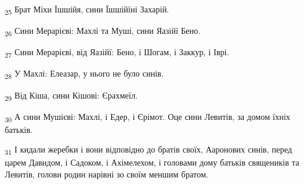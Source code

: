 \begin{tcolorbox}
\textsubscript{25} Брат Міхи Їшшійя, сини Їшшійїні Захарій.
\end{tcolorbox}
\begin{tcolorbox}
\textsubscript{26} Сини Мерарієві: Махлі та Муші, сини Яазійї Бено.
\end{tcolorbox}
\begin{tcolorbox}
\textsubscript{27} Сини Мерарієві, від Яазійї: Бено, і Шогам, і Заккур, і Іврі.
\end{tcolorbox}
\begin{tcolorbox}
\textsubscript{28} У Махлі: Елеазар, у нього не було синів.
\end{tcolorbox}
\begin{tcolorbox}
\textsubscript{29} Від Кіша, сини Кішові: Єрахмеїл.
\end{tcolorbox}
\begin{tcolorbox}
\textsubscript{30} А сини Мушієві: Махлі, і Едер, і Єрімот. Оце сини Левитів, за домом їхніх батьків.
\end{tcolorbox}
\begin{tcolorbox}
\textsubscript{31} І кидали жеребки і вони відповідно до братів своїх, Ааронових синів, перед царем Давидом, і Садоком, і Ахімелехом, і головами дому батьків священиків та Левитів, голови родин нарівні зо своїм меншим братом.
\end{tcolorbox}

